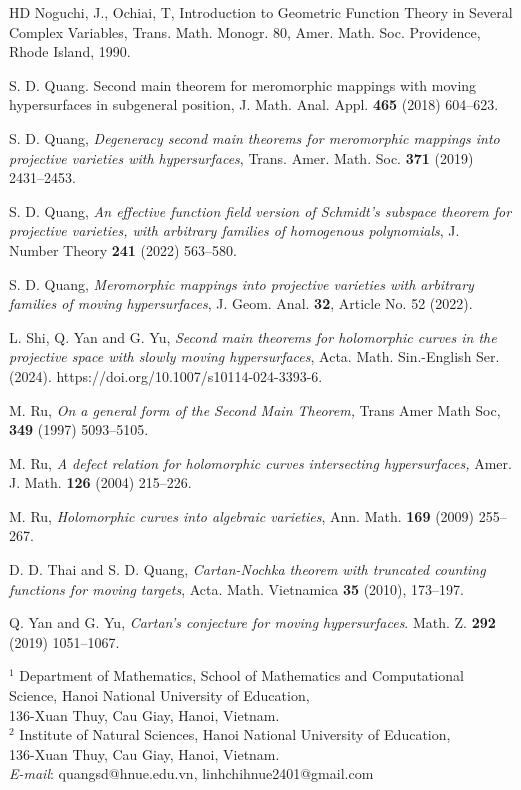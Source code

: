 \documentclass[12pt,leqno]{amsart}
\numberwithin{equation}{section}
\begin{document}
\begin{thebibliography}{HD}
 Noguchi, J., Ochiai, T, Introduction to Geometric Function Theory in Several Complex Variables, Trans. Math. Monogr. 80, Amer. Math. Soc. Providence, Rhode Island, 1990.

 S. D. Quang. Second main theorem for meromorphic mappings with moving hypersurfaces in subgeneral position, J. Math. Anal. Appl. \textbf{465} (2018) 604--623.

 S. D. Quang, \textit{Degeneracy second main theorems for meromorphic mappings into projective varieties with hypersurfaces}, Trans. Amer. Math. Soc. \textbf{371} (2019) 2431--2453.


 S. D. Quang, {\it An effective function field version of Schmidt's subspace theorem for projective varieties, with arbitrary families of homogenous polynomials}, J. Number Theory \textbf{241} (2022) 563--580.

 S. D. Quang, {\it Meromorphic mappings into projective varieties with arbitrary families of moving hypersurfaces}, J. Geom. Anal. \textbf{32}, Article No. 52 (2022). 

 L. Shi, Q. Yan and G. Yu, \textit{Second main theorems for holomorphic curves in the projective space with slowly moving hypersurfaces}, Acta. Math. Sin.-English Ser. (2024). https://doi.org/10.1007/s10114-024-3393-6.

 M. Ru, \textit{On a general form of the Second Main Theorem,} Trans Amer Math Soc, \textbf{349} (1997) 5093--5105.

 M. Ru, \textit{A defect relation for holomorphic curves intersecting hypersurfaces,} Amer. J. Math. \textbf{126} (2004) 215--226.

 M. Ru, \textit{Holomorphic curves into algebraic varieties}, Ann. Math. \textbf{169} (2009) 255--267. 

 D. D. Thai and S. D. Quang, \textit{Cartan-Nochka theorem with truncated counting functions for moving targets}, Acta. Math. Vietnamica \textbf{35} (2010), 173--197.

 Q. Yan and G. Yu, \textit{Cartan's conjecture for moving hypersurfaces}. Math. Z. \textbf{292} (2019) 1051--1067.

\end{thebibliography}

\vskip0.2cm
{\footnotesize 
\noindent
$^1$ Department of Mathematics, School of Mathematics and Computational Science, Hanoi National University of Education,\\
 136-Xuan Thuy, Cau Giay, Hanoi, Vietnam.\\
$^2$ Institute of Natural Sciences, Hanoi National University of Education,\\
 136-Xuan Thuy, Cau Giay, Hanoi, Vietnam.\\
\textit{E-mail}: quangsd@hnue.edu.vn, linhchihnue2401@gmail.com}
\end{document}
